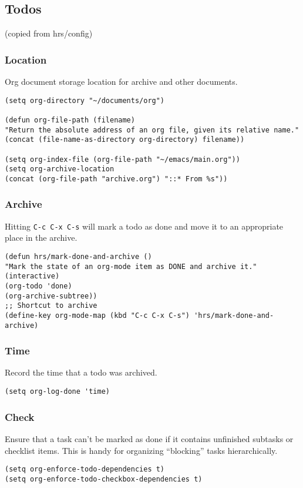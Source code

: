 \documentclass[11pt]{article}
\begin{document}
\subsection*{Todos}
\label{sec:orga7aebbb}
(copied from hrs/config)
\subsubsection*{Location}
\label{sec:org293950a}
Org document storage location for archive and other documents.
\begin{verbatim}
(setq org-directory "~/documents/org")

(defun org-file-path (filename)
"Return the absolute address of an org file, given its relative name."
(concat (file-name-as-directory org-directory) filename))

(setq org-index-file (org-file-path "~/emacs/main.org"))
(setq org-archive-location
(concat (org-file-path "archive.org") "::* From %s"))
\end{verbatim}
\subsubsection*{Archive}
\label{sec:orgddfc9f4}
Hitting \texttt{C-c C-x C-s} will mark a todo as done and move it to an appropriate
place in the archive.
\begin{verbatim}
(defun hrs/mark-done-and-archive ()
"Mark the state of an org-mode item as DONE and archive it."
(interactive)
(org-todo 'done)
(org-archive-subtree))
;; Shortcut to archive
(define-key org-mode-map (kbd "C-c C-x C-s") 'hrs/mark-done-and-archive)
\end{verbatim}
\subsubsection*{Time}
\label{sec:orgfd78390}
Record the time that a todo was archived.
\begin{verbatim}
(setq org-log-done 'time)
\end{verbatim}
\subsubsection*{Check}
\label{sec:org56321a8}
Ensure that a task can't be marked as done if it contains unfinished subtasks
or checklist items. This is handy for organizing ``blocking'' tasks
hierarchically.
\begin{verbatim}
(setq org-enforce-todo-dependencies t)
(setq org-enforce-todo-checkbox-dependencies t)
\end{verbatim}
\end{document}
